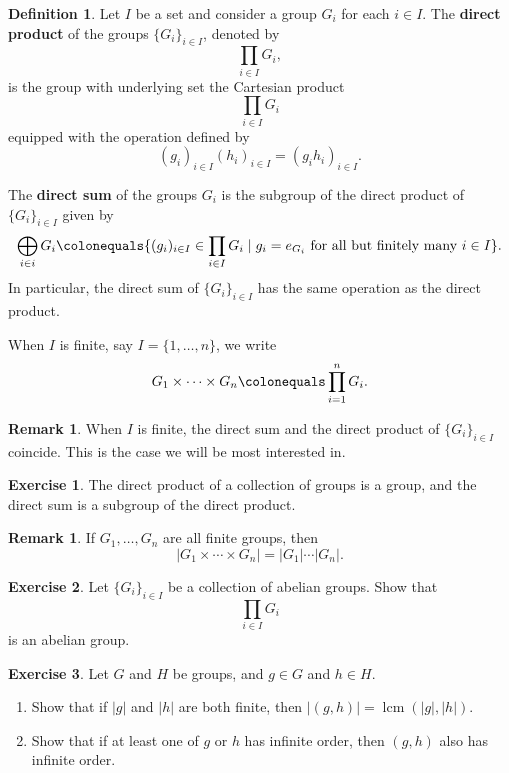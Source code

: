 \documentclass[12pt]{report}
\numberwithin{equation}{section}
\numberwithin{theorem}{chapter}
\theoremstyle{definition}
\newtheorem{definition}[theorem]{Definition}
\newtheorem{exercise}{Exercise}
\newtheorem*{basic properties}{Basic Properties}
\newtheorem*{Important Remark}{Important Remark}
\newtheorem{remark}[theorem]{Remark}
\DeclareMathOperator{\lcm}{lcm}
\begin{document}
\begin{definition}
Let $I$ be a set and consider a group $G_i$ for each $i \in I$.
The {\bf direct product} of the groups $\{ G_i \}_{i \in I}$, denoted by
$$\prod_{i \in I} G_i,$$
is the group with underlying set the Cartesian product 
$$\prod_{i \in I} G_i$$
equipped with the operation defined by
$$(g_i)_{i \in  I} (h_i)_{i \in I} = (g_i h_i)_{i \in I}.$$ 

The {\bf direct sum} of the groups $G_i$ is the subgroup of the direct product of  $\{ G_i \}_{i \in I}$ given by
$$\bigoplus_{i \in i} G_i \colonequals \{(g_i)_{i \in I} \in \prod_{i \in I} G_i \mid  g_i = e_{G_i} \text{ for all but finitely many } i \in I \}.$$ 
In particular, the direct sum of $\{ G_i \}_{i \in I}$ has the same operation as the direct product. 

When $I$ is finite, say $I = \{ 1, \ldots, n \}$, we write
$$G_1 \times \cdots \times G_n \colonequals \prod_{i = 1}^n G_i.$$
\end{definition}


\begin{remark}
	When $I$ is finite, the direct sum and the direct product of $\{ G_i \}_{i \in I}$ coincide. This is the case we will be most interested in.
\end{remark}


\begin{exercise}\label{direct product group}
	The direct product of a collection of groups is a group, and the direct sum is a subgroup of the direct product.
\end{exercise}


\begin{remark}
	If $G_1, \ldots, G_n$ are all finite groups, then
	$$|G_1 \times \cdots \times G_n| = |G_1| \cdots |G_n|.$$
\end{remark}


\begin{exercise}
	Let $\{ G_i \}_{i \in I}$ be a collection of abelian groups. Show that
	$$\prod_{i \in I} G_i$$
	is an abelian group.
\end{exercise}


\begin{exercise}\label{order of pairs}
	Let $G$ and $H$ be groups, and $g \in G$ and $h \in H$.

\vspace{-0.3em}
\begin{enumerate}[label=(\alph*), itemsep=0.2em]

\item Show that if $|g|$ and $|h|$ are both finite, then $|(g,h)| = \lcm(|g|,|h|)$.

\item Show that if at least one of $g$ or $h$ has infinite order, then $(g,h)$ also has infinite order.

\end{enumerate}
\end{exercise}
\end{document}

